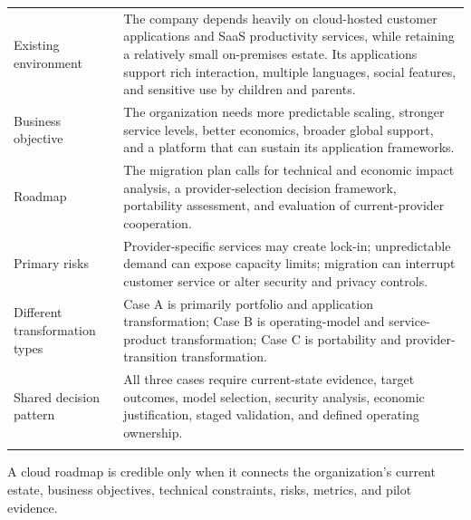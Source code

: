 \documentclass[11pt]{article}
\begin{document}
\begin{longtable}{@{}>{\RaggedRight\arraybackslash}p{}>{\RaggedRight\arraybackslash}p{}@{}}
Existing environment & The company depends heavily on cloud-hosted customer applications and SaaS productivity services, while retaining a relatively small on-premises estate. Its applications support rich interaction, multiple languages, social features, and sensitive use by children and parents. \\\addlinespace[2pt]
Business objective & The organization needs more predictable scaling, stronger service levels, better economics, broader global support, and a platform that can sustain its application frameworks. \\\addlinespace[2pt]
Roadmap & The migration plan calls for technical and economic impact analysis, a provider-selection decision framework, portability assessment, and evaluation of current-provider cooperation. \\\addlinespace[2pt]
Primary risks & Provider-specific services may create lock-in; unpredictable demand can expose capacity limits; migration can interrupt customer service or alter security and privacy controls. \\\addlinespace[2pt]
Different transformation types & Case A is primarily portfolio and application transformation; Case B is operating-model and service-product transformation; Case C is portability and provider-transition transformation. \\\addlinespace[2pt]
Shared decision pattern & All three cases require current-state evidence, target outcomes, model selection, security analysis, economic justification, staged validation, and defined operating ownership. \\\addlinespace[2pt]
\bottomrule
\end{longtable}
\begin{takeawaybox}
A cloud roadmap is credible only when it connects the organization's current estate, business objectives, technical constraints, risks, metrics, and pilot evidence.
\end{takeawaybox}
\end{document}
